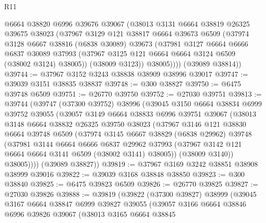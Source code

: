 \begin{lexlean}{R11}
\begin{coremodule}
          @6664
          @38820
          @6996
          @39676
          @39067
          (@38013
            @3131
            @6664
            @38819
            @26325
            @39675
            @38023
            (@37967
              @3129
              @121
              @38817
              @6664
              @39673
              @6509
              (@37974
                @3128
                @6667
                @38816
                (@6838 @30089)
                @39673
                (@37981
                  @3127
                  @6664
                  @6666
                  @6837
                  @30089
                  @37993
                  (@37967 @3125 @121 @6664 @6664 @3124 @6509 (@38002 @3124) @38005))
                (@38009 @3123))
              @38005))))
      (@39089 @38814))
@39744 := @37967 @3152 @3243 @38838 @38909 @38996 @39017
@39747 := @39039 @3151 @38835 @38837
@39748 := @300 @38827
@39750 := @6475 @39748 @6509
@39751 := @26770 @39750
@39752 := @27030 @39751
@39813 := @39744
    (@39747
      (@37300 @39752)
      @38996
      (@39045
        @3150
        @6664
        @38834
        @6999
        @39752
        @39055
        (@39057
          @3149
          @6664
          @38833
          @6996
          @39751
          @39067
          (@38013
            @3148
            @6664
            @38832
            @26325
            @39750
            @38023
            (@37967
              @3146
              @121
              @38830
              @6664
              @39748
              @6509
              (@37974
                @3145
                @6667
                @38829
                (@6838 @29962)
                @39748
                (@37981
                  @3144
                  @6664
                  @6666
                  @6837
                  @29962
                  @37993
                  (@37967 @3142 @121 @6664 @6664 @3141 @6509 (@38002 @3141) @38005))
                (@38009 @3140))
              @38005))))
      (@39089 @38827))
@39819 := @37967 @3169 @3242 @38851 @38908 @38999 @39016
@39822 := @39039 @3168 @38848 @38850
@39823 := @300 @38840
@39825 := @6475 @39823 @6509
@39826 := @26770 @39825
@39827 := @27030 @39826
@39888 := @39819
    (@39822
      (@37300 @39827)
      @38999
      (@39045
        @3167
        @6664
        @38847
        @6999
        @39827
        @39055
        (@39057
          @3166
          @6664
          @38846
          @6996
          @39826
          @39067
          (@38013
            @3165
            @6664
            @38845

\end{coremodule}
\end{lexlean}
